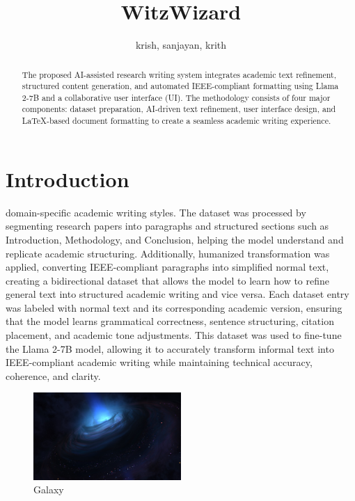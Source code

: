 \documentclass[conference]{IEEEtran}
\title{WitzWizard}
\author{krish, sanjayan, krith}
\begin{document}
\maketitle

\begin{abstract}
The proposed AI-assisted research writing system integrates academic text refinement, structured content generation, and automated IEEE-compliant formatting using Llama 2-7B and a collaborative user interface (UI). The methodology consists of four major components: dataset preparation, AI-driven text refinement, user interface design, and LaTeX-based document formatting to create a seamless academic writing experience.
\end{abstract}




  \section{Introduction}
  domain-specific academic writing styles. The dataset was processed by segmenting research papers into paragraphs and structured sections such as Introduction, Methodology, and Conclusion, helping the model understand and replicate academic structuring. Additionally, humanized transformation was applied, converting IEEE-compliant paragraphs into simplified normal text, creating a bidirectional dataset that allows the model to learn how to refine general text into structured academic writing and vice versa. Each dataset entry was labeled with normal text and its corresponding academic version, ensuring that the model learns grammatical correctness, sentence structuring, citation placement, and academic tone adjustments. This dataset was used to fine-tune the Llama 2-7B model, allowing it to accurately transform informal text into IEEE-compliant academic writing while maintaining technical accuracy, coherence, and clarity.


\begin{figure}[h]
\centering
\includegraphics[width=0.5\textwidth]{..//uploads/1740064117608.jpg}
\caption{Galaxy}
\end{figure}
\end{document}
